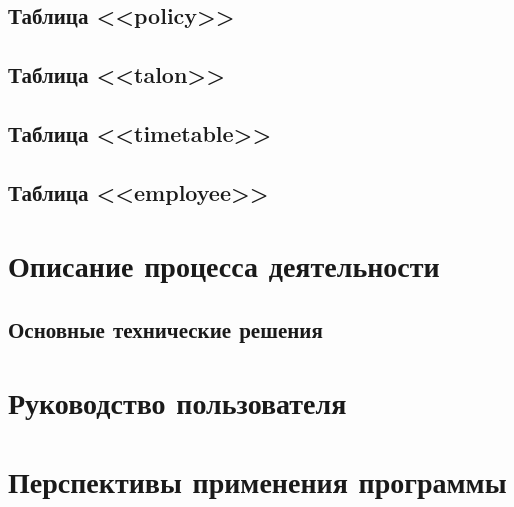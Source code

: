 \subsection{Таблица <<policy>>}

\subsection{Таблица <<talon>>}

\subsection{Таблица <<timetable>>}

\subsection{Таблица <<employee>>}



\newpage
\section{Описание процесса деятельности} 
\setcounter{figure}{0}







\newpage




\newpage
\subsection{Основные технические решения}



\newpage
\section{Руководство пользователя}
\setcounter{figure}{0}


\newpage
\section{Перспективы применения программы}
\setcounter{figure}{0}


% 
% 
% 



